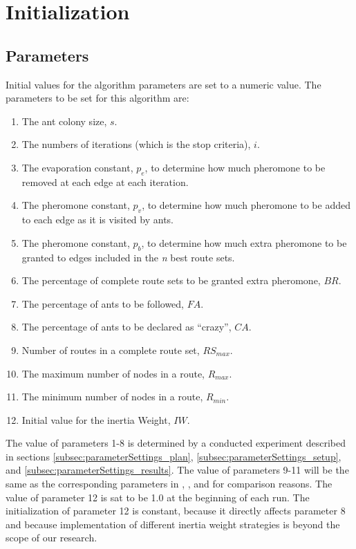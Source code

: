 \section{Initialization}
\subsection{Parameters}
Initial values for the algorithm parameters are set to a numeric value. The parameters to be set for this algorithm are:
\begin{enumerate}
\item The ant colony size, $s$. 
\item The numbers of iterations (which is the stop criteria), $i$.
\item The evaporation constant, $p_e$, to determine how much pheromone to be removed at each edge at each iteration.
\item The pheromone constant, $p_v$, to determine how much pheromone to be added to each edge as it is visited by ants.
\item The pheromone constant, $p_b$, to determine how much extra pheromone to be granted to edges included in the \textit{n} best route sets.
\item The percentage of complete route sets to be granted extra pheromone, $BR$.
\item The percentage of ants to be followed, $FA$.
\item The percentage of ants to be declared as ``crazy'', $CA$.
\item Number of routes in a complete route set, $RS_{max}$. 
\item The maximum number of nodes in a route, $R_{max}$.
\item The minimum number of nodes in a route, $R_{min}$.
\item Initial value for the inertia Weight, $IW$.
\end{enumerate}
The value of parameters 1-8 is determined by a conducted experiment described in sections \vref{subsec:parameterSettings_plan}, \vref{subsec:parameterSettings_setup}, and \vref{subsec:parameterSettings_results}. The value of parameters 9-11 will be the same as the corresponding parameters in \citet{mandl79}, \citet{kechagiopoulos14}, and \citet{nikolic14} for comparison reasons. The value of parameter 12 is sat to be 1.0 at the beginning of each run. The initialization of parameter 12 is constant, because it directly affects parameter 8 and because implementation of different inertia weight strategies is beyond the scope of our research.   

